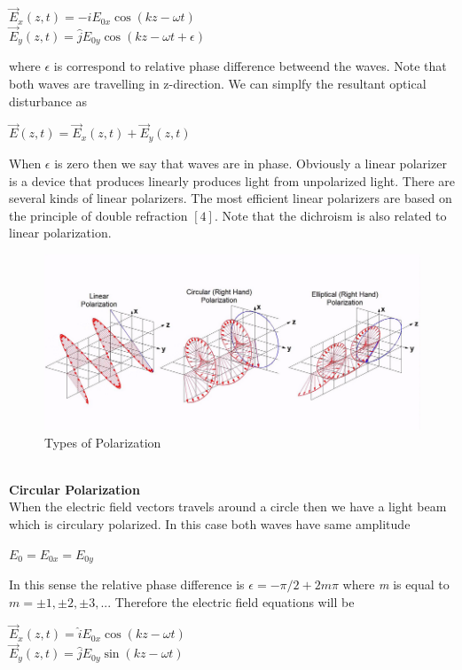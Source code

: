 \documentclass[a4paper,12pt]{report}
\begin{document}
\begin{center}
	$\vec{E}_{x}(z,t)=-\hat{i}E_{0x}\cos(kz-\omega t)$\\$\vec{E}_{y}(z,t)=\hat{j}E_{0y}\cos(kz-\omega t+\epsilon)$
\end{center}
where $\epsilon$ is correspond to relative phase difference betweend the waves. Note that both waves are travelling in z-direction. We can simplfy the resultant optical disturbance as 
\begin{center}
	$\vec{E}(z,t)=\vec{E}_{x}(z,t)+\vec{E}_{y}(z,t)$
\end{center}
When $\epsilon$ is zero then we say that waves are in phase. Obviously a linear polarizer is a device that produces linearly produces light from unpolarized light. There are several kinds of linear polarizers. The most efficient linear polarizers are based on the principle of double refraction $[4]$. Note that the dichroism is also related to linear polarization. 
\begin{figure}[h]
\centering
\includegraphics[width=1.0\linewidth, height=0.3\textheight]{"Types of polarization"}
\caption{Types of Polarization}
\label{fig:Typesofpolarization}
\end{figure}
\\
\textbf{Circular Polarization}\\
When the electric field vectors travels around a circle then we have a light beam which is circulary polarized. In this case both waves have same amplitude
\begin{center}
	$E_{0}=E_{0x}=E_{0y}$ 
\end{center}
In this sense the relative phase difference is $\epsilon=-\pi/2+2m\pi$ where \textit{m} is equal to $m=\pm1,\pm2,\pm3,...$ Therefore the electric field equations will be  
\begin{center}
	$\vec{E}_{x}(z,t)=\hat{i}E_{0x}\cos(kz-\omega t)$\\$\vec{E}_{y}(z,t)=\hat{j}E_{0y}\sin(kz-\omega t)$
\end{center}
\end{document}
